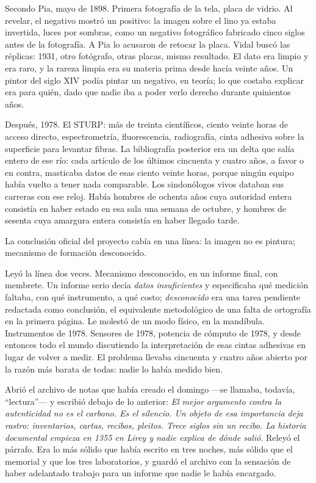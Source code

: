 Secondo Pia, mayo de 1898. Primera fotografía de la tela, placa de vidrio. Al revelar, el negativo mostró un positivo: la imagen sobre el lino ya estaba invertida, luces por sombras, como un negativo fotográfico fabricado cinco siglos antes de la fotografía. A Pia lo acusaron de retocar la placa. Vidal buscó las réplicas: 1931, otro fotógrafo, otras placas, mismo resultado. El dato era limpio y era raro, y la rareza limpia era su materia prima desde hacía veinte años. Un pintor del siglo XIV podía pintar un negativo, en teoría; lo que costaba explicar era para quién, dado que nadie iba a poder verlo derecho durante quinientos años.

Después, 1978. El STURP: más de treinta científicos, ciento veinte horas de acceso directo, espectrometría, fluorescencia, radiografía, cinta adhesiva sobre la superficie para levantar fibras. La bibliografía posterior era un delta que salía entero de ese río: cada artículo de los últimos cincuenta y cuatro años, a favor o en contra, masticaba datos de esas ciento veinte horas, porque ningún equipo había vuelto a tener nada comparable. Los sindonólogos vivos databan sus carreras con ese reloj. Había hombres de ochenta años cuya autoridad entera consistía en haber estado en esa sala una semana de octubre, y hombres de sesenta cuya amargura entera consistía en haber llegado tarde.

La conclusión oficial del proyecto cabía en una línea: la imagen no es pintura; mecanismo de formación desconocido.

Leyó la línea dos veces. Mecanismo desconocido, en un informe final, con membrete. Un informe serio decía \textit{datos insuficientes} y especificaba qué medición faltaba, con qué instrumento, a qué costo; \textit{desconocido} era una tarea pendiente redactada como conclusión, el equivalente metodológico de una falta de ortografía en la primera página. Le molestó de un modo físico, en la mandíbula. Instrumentos de 1978. Sensores de 1978, potencia de cómputo de 1978, y desde entonces todo el mundo discutiendo la interpretación de esas cintas adhesivas en lugar de volver a medir. El problema llevaba cincuenta y cuatro años abierto por la razón más barata de todas: nadie lo había medido bien.

Abrió el archivo de notas que había creado el domingo ---se llamaba, todavía, ``lectura''--- y escribió debajo de lo anterior: \textit{El mejor argumento contra la autenticidad no es el carbono. Es el silencio. Un objeto de esa importancia deja rastro: inventarios, cartas, recibos, pleitos. Trece siglos sin un recibo. La historia documental empieza en 1355 en Lirey y nadie explica de dónde salió.} Releyó el párrafo. Era lo más sólido que había escrito en tres noches, más sólido que el memorial y que los tres laboratorios, y guardó el archivo con la sensación de haber adelantado trabajo para un informe que nadie le había encargado.

